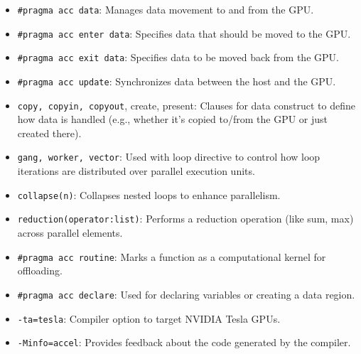 \begin{itemize}
\item \verb`#pragma acc data`: Manages data movement to and from the GPU.
\item \verb`#pragma acc enter data`: Specifies data that should be moved to the GPU.
\item \verb`#pragma acc exit data`: Specifies data to be moved back from the GPU.
\item \verb`#pragma acc update`: Synchronizes data between the host and the GPU.
\item \verb`copy, copyin, copyout`, create, present: Clauses for data construct to define how data is handled (e.g., whether it's copied to/from the GPU or just created there).
\end{itemize}

\begin{itemize}
\item \verb`gang, worker, vector`: Used with loop directive to control how loop iterations are distributed over parallel execution units.
\item \verb`collapse(n)`: Collapses nested loops to enhance parallelism.
\item \verb`reduction(operator:list)`: Performs a reduction operation (like sum, max) across parallel elements.
\end{itemize}

\begin{itemize}
\item \verb`#pragma acc routine`: Marks a function as a computational kernel for offloading.
\item \verb`#pragma acc declare`: Used for declaring variables or creating a data region.
\end{itemize}

\begin{itemize}
\item \verb`-ta=tesla`: Compiler option to target NVIDIA Tesla GPUs.
\item \verb`-Minfo=accel`: Provides feedback about the code generated by the compiler.
\end{itemize}
